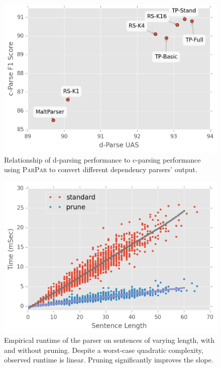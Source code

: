 \documentclass[11pt,letterpaper]{article}
\newcommand{\ParseName}{\textsc{ParPar}\xspace}
\begin{document}
\begin{figure}
  \centering
  \includegraphics[scale=0.5]{../notebooks/parsers}
\caption{\label{fig:corr} Relationship of d-parsing performance to
  c-parsing performance using \ParseName to convert different
  dependency parsers' output.}
\end{figure}


\begin{figure}
  \centering
  \includegraphics[scale=0.5]{../notebooks/comp}
  \caption{Empirical runtime of the parser on sentences of varying length, with and without pruning. 
  Despite a worst-case quadratic complexity, observed runtime is
  linear. Pruning significantly improves the slope.
\label{fig:speed}}
\end{figure}
\end{document}
